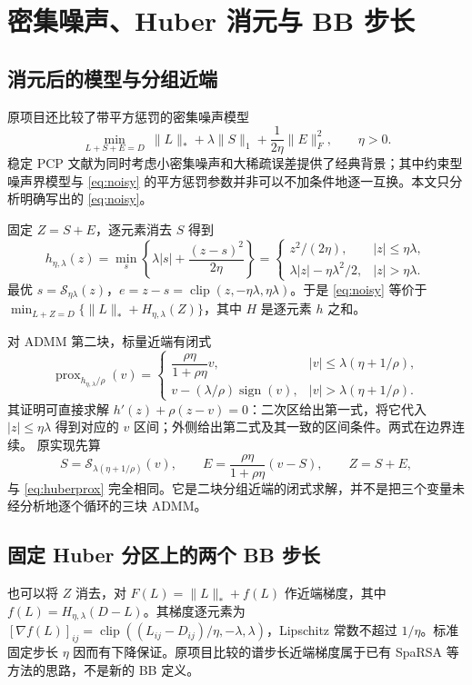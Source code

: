 \documentclass[UTF8,fontset=none,zihao=-4,a4paper]{ctexart}
\theoremstyle{plainzh}
\newcommand{\nuc}[1]{\lVert #1\rVert_*}
\newcommand{\fro}[1]{\lVert #1\rVert_F}
\newcommand{\ellone}[1]{\lVert #1\rVert_1}
\newcommand{\prox}{\operatorname{prox}}
\newcommand{\soft}{\mathcal S}
\newcommand{\sgn}{\operatorname{sign}}
\numberwithin{equation}{section}
\begin{document}
\section{密集噪声、Huber 消元与 BB 步长}
\subsection{消元后的模型与分组近端}
原项目还比较了带平方惩罚的密集噪声模型
\begin{equation}\label{eq:noisy}
 \min_{L+S+E=D}\ \nuc L+\lambda\ellone S+\frac1{2\eta}\fro E^2,
 \qquad \eta>0.
\end{equation}
稳定 PCP 文献\cite{stable}为同时考虑小密集噪声和大稀疏误差提供了经典背景；其中约束型噪声界模型与 \eqref{eq:noisy} 的平方惩罚参数并非可以不加条件地逐一互换。本文只分析明确写出的 \eqref{eq:noisy}。

固定 $Z=S+E$，逐元素消去 $S$ 得到
\begin{equation}
 h_{\eta,\lambda}(z)=\min_s\left\{\lambda|s|+\frac{(z-s)^2}{2\eta}\right\}
 =\begin{cases}z^2/(2\eta),&|z|\leq\eta\lambda,\\
 \lambda|z|-\eta\lambda^2/2,&|z|>\eta\lambda.
 \end{cases}
\end{equation}
最优 $s=\soft_{\eta\lambda}(z)$，$e=z-s=\operatorname{clip}(z,-\eta\lambda,\eta\lambda)$。于是 \eqref{eq:noisy} 等价于
$\min_{L+Z=D}\{\nuc L+H_{\eta,\lambda}(Z)\}$，其中 $H$ 是逐元素 $h$ 之和。

对 ADMM 第二块，标量近端有闭式
\begin{equation}\label{eq:huberprox}
 \prox_{h_{\eta,\lambda}/\rho}(v)
 =\begin{cases}
 \dfrac{\rho\eta}{1+\rho\eta}v,&|v|\leq\lambda(\eta+1/\rho),\\
 v-(\lambda/\rho)\sgn(v),&|v|>\lambda(\eta+1/\rho).
 \end{cases}
\end{equation}
其证明可直接求解 $h'(z)+\rho(z-v)=0$：二次区给出第一式，将它代入 $|z|\leq\eta\lambda$ 得到对应的 $v$ 区间；外侧给出第二式及其一致的区间条件。两式在边界连续。
原实现先算
\begin{equation}
 S=\soft_{\lambda(\eta+1/\rho)}(v),\qquad
 E=\frac{\rho\eta}{1+\rho\eta}(v-S),\qquad Z=S+E,
\end{equation}
与 \eqref{eq:huberprox} 完全相同。它是二块分组近端的闭式求解，并不是把三个变量未经分析地逐个循环的三块 ADMM。

\subsection{固定 Huber 分区上的两个 BB 步长}
也可以将 $Z$ 消去，对 $F(L)=\nuc L+f(L)$ 作近端梯度，其中
$f(L)=H_{\eta,\lambda}(D-L)$。其梯度逐元素为
$[\nabla f(L)]_{ij}=\operatorname{clip}((L_{ij}-D_{ij})/\eta,-\lambda,\lambda)$，Lipschitz 常数不超过 $1/\eta$。标准固定步长 $\eta$ 因而有下降保证。原项目比较的谱步长近端梯度属于已有 SpaRSA 等方法的思路\cite{sparsa}，不是新的 BB 定义。
\end{document}
